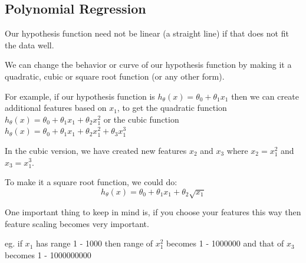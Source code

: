 \documentclass[10pt,a4paper,UTF8]{article}
\begin{document}
\subsection{Polynomial Regression}
\label{sec:org4f292eb}
Our hypothesis function need not be linear (a straight line) if that does not fit the data well.

We can change the behavior or curve of our hypothesis function by making it a quadratic, cubic or square root function (or any other form).

For example, if our hypothesis function is \(h_{\theta}(x) = \theta_{0} + \theta_{1}x_{1}\) then we can create additional features based on \(x_{1}\), to get the quadratic function \(h_{\theta}(x) = \theta_{0} + \theta_{1}x_{1} + \theta_{2}x_{1}^{2}\) or the cubic function \(h_{\theta}(x) = \theta_{0} + \theta_{1}x_{1} + \theta_{2}x_{1}^{2} + \theta_{3}x_{1}^{3}\)

In the cubic version, we have created new features \(x_{2}\) and \(x_{3}\) where \(x_{2}  = x_{1}^{2}\) and \(x_{3} = x_{1}^{3}\).

To make it a square root function, we could do:
\begin{equation}
\label{eq:6}
h_{\theta}(x) = \theta_{0} + \theta_{1}x_{1} + \theta_{2}\sqrt{x_{1}}
\end{equation}

One important thing to keep in mind is, if you choose your features this way then feature scaling becomes very important.

eg. if \(x_{1}\) has range 1 - 1000 then range of \(x_{1}^{2}\) becomes 1 - 1000000 and that of \(x_{3}\) becomes 1 - 1000000000
\end{document}
